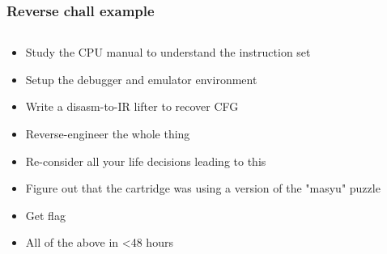 \documentclass[aspectratio=169]{beamer}
\begin{document}
\begin{frame}
	\frametitle{Reverse chall example}
	\begin{columns}
		\begin{column}{0.65\textwidth}
			\begin{itemize}
				\item Study the CPU manual to understand the instruction set
				\item Setup the debugger and emulator environment
				\item Write a disasm-to-IR lifter to recover CFG 
				\item Reverse-engineer the whole thing
				\item Re-consider all your life decisions leading to this
				\item Figure out that the cartridge was using a version of the "masyu" puzzle
				\item Get flag
				\item All of the above in \textless 48 hours
			\end{itemize}
		\end{column}
		\begin{column}{0.35\textwidth}
		\end{column}
	\end{columns}
\end{frame}
\end{document}
